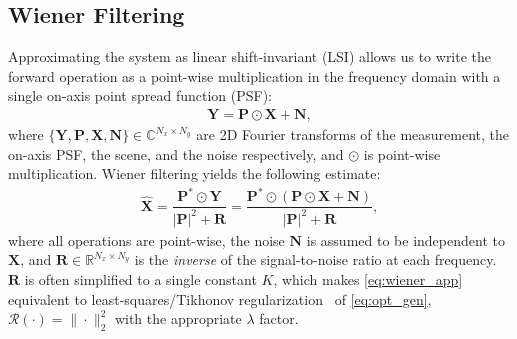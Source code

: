 \subsection{Wiener Filtering}

\noindent Approximating the system as linear shift-invariant (LSI) allows us to write the forward operation as a point-wise multiplication in the frequency domain with a single on-axis point spread function (PSF):
\begin{align}
\label{eq:lsi_forward_app}
    \bm{Y} = \bm{P} \odot \bm{X} + \bm{N},
\end{align}
where $\{\bm{Y}, \bm{P}, \bm{X}, \bm{N}\} \in \mathbb{C}^{N_x \times N_y}$ are 2D Fourier transforms of the measurement, the on-axis PSF, the scene, and the noise respectively, and $\odot$ is point-wise multiplication.
Wiener filtering yields the following estimate:
\begin{align}
    \label{eq:wiener_app}
    \bm{\hat{X}} = \dfrac{\bm{P}^*  \odot \bm{Y}}{ |\bm{P}|^2 + \bm{R}} =  \dfrac{\bm{P}^* \odot (\bm{P} \odot\bm{X} + \bm{N})}{ |\bm{P}|^2 + \bm{R}},
\end{align}
where all operations are point-wise,
the noise $\bm{N}$ is assumed to be independent to $\bm{X}$, and $\bm{R}\in \mathbb{R}^{N_x \times N_y}$ is the \textit{inverse} of the signal-to-noise ratio at each frequency.
$\bm{R}$ is often simplified to a single constant $K$,
which makes \cref{eq:wiener_app} equivalent to least-squares/Tikhonov  regularization~\cite{flatcam} of \cref{eq:opt_gen}, \ie $\mathcal{R}(\cdot) = \|\cdot\|^2_2$ with the appropriate $\lambda$ factor.

